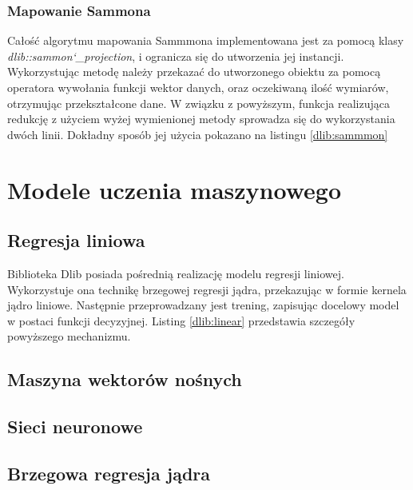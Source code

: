 
\subsubsection{Mapowanie Sammona}

Całość algorytmu mapowania Sammmona implementowana jest za pomocą klasy \textit{dlib::sammon\char`_projection}, i ogranicza się do utworzenia jej instancji. Wykorzystując metodę należy przekazać do utworzonego obiektu za pomocą operatora wywołania funkcji wektor danych, oraz oczekiwaną ilość wymiarów, otrzymując przekształcone dane. W związku z powyższym, funkcja realizująca redukcję z użyciem wyżej wymienionej metody sprowadza się do wykorzystania dwóch linii. Dokładny sposób jej użycia pokazano na listingu \ref{dlib:sammmon}


\section{Modele uczenia maszynowego}

\subsection{Regresja liniowa}
Biblioteka Dlib posiada pośrednią realizację modelu regresji liniowej. Wykorzystuje ona technikę brzegowej regresji jądra, przekazując w formie kernela jądro liniowe. Następnie przeprowadzany jest trening, zapisując docelowy model w postaci funkcji decyzyjnej. Listing \ref{dlib:linear} przedstawia szczegóły powyższego mechanizmu.


\subsection{Maszyna wektorów nośnych}
\subsection{Sieci neuronowe}
\subsection{Brzegowa regresja jądra}

